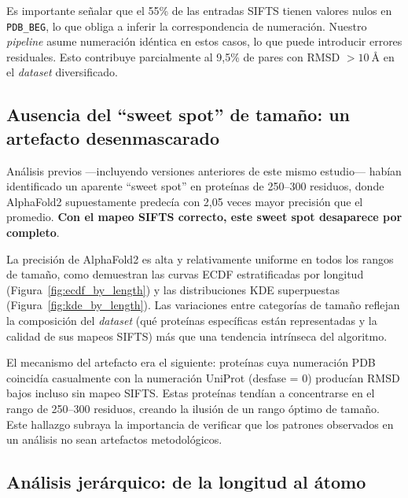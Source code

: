 Es importante se\~nalar que el 55\% de las entradas SIFTS tienen valores nulos en
\texttt{PDB\_BEG}, lo que obliga a inferir la correspondencia de numeraci\'on. Nuestro
\textit{pipeline} asume numeraci\'on id\'entica en estos casos, lo que puede introducir errores
residuales. Esto contribuye parcialmente al 9,5\% de pares con RMSD $> \SI{10}{\angstrom}$
en el \textit{dataset} diversificado.

\subsection{Ausencia del ``sweet spot'' de tama\~no: un artefacto desenmascarado}
\label{subsec:ausencia_sweet_spot}

An\'alisis previos ---incluyendo versiones anteriores de este mismo estudio--- hab\'ian
identificado un aparente ``sweet spot'' en prote\'inas de 250--300 residuos, donde
AlphaFold2 supuestamente predec\'ia con 2,05 veces mayor precisi\'on que el promedio.
\textbf{Con el mapeo SIFTS correcto, este sweet spot desaparece por completo}.

La precisi\'on de AlphaFold2 es alta y relativamente uniforme en todos los rangos
de tama\~no, como demuestran las curvas ECDF estratificadas por longitud
(Figura~\ref{fig:ecdf_by_length}) y las distribuciones KDE superpuestas
(Figura~\ref{fig:kde_by_length}). Las variaciones entre categor\'ias de
tama\~no reflejan la composici\'on del \textit{dataset} (qu\'e prote\'inas espec\'ificas est\'an
representadas y la calidad de sus mapeos SIFTS) m\'as que una tendencia intr\'inseca
del algoritmo.

El mecanismo del artefacto era el siguiente: prote\'inas cuya numeraci\'on PDB
coincid\'ia casualmente con la numeraci\'on UniProt (desfase = 0) produc\'ian RMSD
bajos incluso sin mapeo SIFTS. Estas prote\'inas tend\'ian a concentrarse en el rango
de 250--300 residuos, creando la ilusi\'on de un rango \'optimo de tama\~no. Este
hallazgo subraya la importancia de verificar que los patrones observados en un
an\'alisis no sean artefactos metodol\'ogicos.

\subsection{An\'alisis jer\'arquico: de la longitud al \'atomo}
\label{subsec:analisis_jerarquico_discusion}

